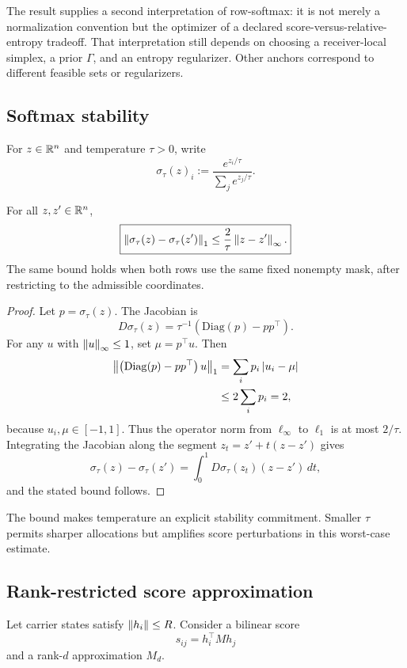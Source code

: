 The result supplies a second interpretation of row-softmax: it is not merely a normalization convention but the optimizer of a declared score-versus-relative-entropy tradeoff. That interpretation still depends on choosing a receiver-local simplex, a prior $\Gamma$, and an entropy regularizer. Other anchors correspond to different feasible sets or regularizers.

\subsection{Softmax stability}

For $z\in\mathbb{R}^n$ and temperature $\tau>0$, write
\[
\sigma_\tau(z)_i
:=
\frac{e^{z_i/\tau}}{\sum_j e^{z_j/\tau}}.
\]

\begin{lemma}\label{lem:supp-softmax-lipschitz}
For all $z,z'\in\mathbb{R}^n$,
\[
\boxed{
\left\lVert \sigma_\tau(z)-\sigma_\tau(z')\right\rVert_1
\le
\frac{2}{\tau}\left\lVert z-z'\right\rVert_\infty.
}
\]
The same bound holds when both rows use the same fixed nonempty mask, after restricting to the admissible coordinates.
\end{lemma}

\begin{proof}
Let $p=\sigma_\tau(z)$. The Jacobian is
\[
D\sigma_\tau(z)
=
\tau^{-1}\left(\mathrm{Diag}(p)-pp^\top\right).
\]
For any $u$ with $\left\lVert u\right\rVert_\infty\le1$, set $\mu=p^\top u$. Then
\[
\begin{aligned}
\left\lVert \left(\mathrm{Diag}(p)-pp^\top\right)u\right\rVert_1
&=
\sum_i p_i\left|u_i-\mu\right|\\
&\le
2\sum_i p_i
=2,
\end{aligned}
\]
because $u_i,\mu\in[-1,1]$. Thus the operator norm from $\ell_\infty$ to $\ell_1$ is at most $2/\tau$. Integrating the Jacobian along the segment $z_t=z'+t(z-z')$ gives
\[
\sigma_\tau(z)-\sigma_\tau(z')
=
\int_0^1D\sigma_\tau(z_t)(z-z')\,dt,
\]
and the stated bound follows.
\end{proof}

The bound makes temperature an explicit stability commitment. Smaller $\tau$ permits sharper allocations but amplifies score perturbations in this worst-case estimate.

\subsection{Rank-restricted score approximation}

Let carrier states satisfy $\left\lVert h_i\right\rVert\le R$. Consider a bilinear score
\[
s_{ij}=h_i^\top Mh_j
\]
and a rank-$d$ approximation $M_d$.

